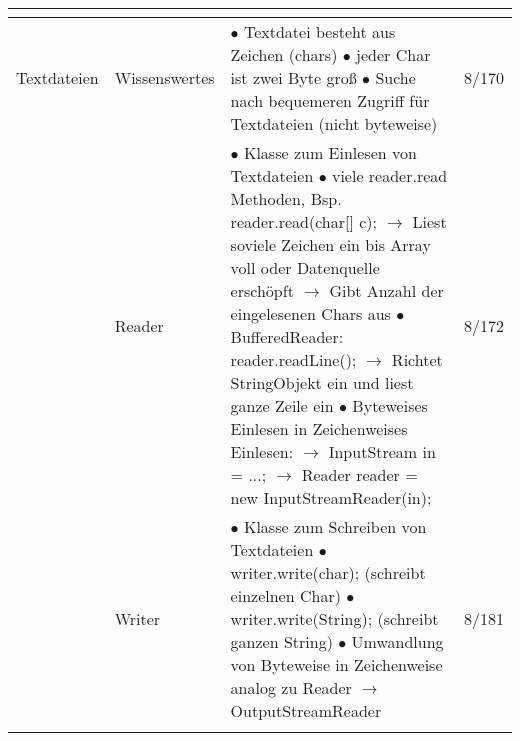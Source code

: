 \documentclass[11pt,a4paper]{article}
\begin{document}
\begin{center}
\begin{longtable}[h]{ | p{2.3cm} | p{2.3cm} | p{12.6cm} | p{1.2cm} | }
	
	
	\multicolumn{3}{c}{} \\ 
	\hline 
	
	
	
	{\large Textdateien} & Wissenswertes & \makecell[l]{$\bullet$ Textdatei besteht aus Zeichen (chars) \\
	$\bullet$ jeder Char ist zwei Byte groß \\
	$\bullet$ Suche nach bequemeren Zugriff für Textdateien (nicht byteweise) } & 8/170 \\ \cline{2-4}
	
	& Reader & \makecell[l]{$\bullet$ Klasse zum Einlesen von Textdateien \\
	$\bullet$ viele reader.read Methoden, Bsp. reader.read(char[] c); \\
	\hspace{0.4cm} $\rightarrow$ Liest soviele Zeichen ein bis Array voll oder Datenquelle erschöpft\\
	\hspace{0.4cm} $\rightarrow$ Gibt Anzahl der eingelesenen Chars aus \\
	$\bullet$ BufferedReader: reader.readLine();\\
	\hspace{0.4cm} $\rightarrow$ Richtet StringObjekt ein und liest ganze Zeile ein  \\
	$\bullet$ Byteweises Einlesen in Zeichenweises Einlesen: \\
	\hspace{0.4cm} $\rightarrow$ InputStream in = ...; \\
	\hspace{0.4cm} $\rightarrow$ Reader reader = new InputStreamReader(in);}  & 8/172 \\ \cline{2-4}
	
	& Writer & \makecell[l]{$\bullet$ Klasse zum Schreiben von Textdateien \\
	$\bullet$ writer.write(char); (schreibt einzelnen Char) \\
	$\bullet$ writer.write(String); (schreibt ganzen String) \\
	$\bullet$ Umwandlung von Byteweise in Zeichenweise analog zu Reader \\
	\hspace{0.4cm} $\rightarrow$ OutputStreamReader }  & 8/181 \\ 
	\hline
	
	
	
	\multicolumn{3}{c}{} \\ 
	\hline 
	

\end{longtable}
\end{center}
\end{document}

